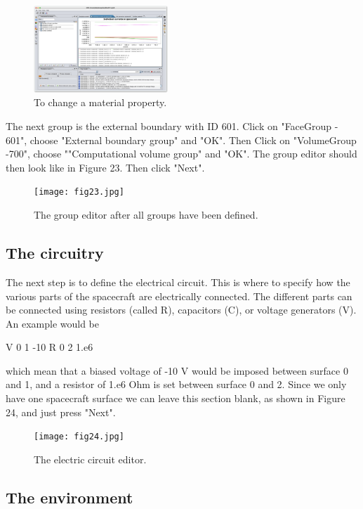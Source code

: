 \documentclass[a4paper, 11pt]{article}
\begin{document}
\begin{figure}[!ht]
    \centering
    \includegraphics[width=0.45\textwidth]{fig22.jpg}
    \caption{To change a material property.}
\end{figure}

The next group is the external boundary with ID 601. Click on "FaceGroup - 601",  choose "External boundary group" and "OK". Then Click on "VolumeGroup -700", choose ""Computational volume group" and "OK". The group editor should then look like in Figure 23. Then click "Next".

\begin{figure}[!ht]
    \centering
    \texttt{[image: fig23.jpg]}
    \caption{The group editor after all groups have been defined.}
\end{figure}

\subsection{The circuitry}

The next step is to define the electrical circuit. This is where to specify how the various parts of the spacecraft are electrically connected. The different parts can be connected using resistors (called R), capacitors (C), or voltage generators (V). An example would be\par

V  0  1  -10
R  0  2  1.e6

which mean that a biased voltage of -10 V would be imposed between surface 0 and 1, and a resistor of 1.e6 Ohm is set between surface 0 and 2. Since we only have one spacecraft surface we can leave this section blank, as shown in Figure 24, and just press "Next".

\begin{figure}[!ht]
    \centering
    \texttt{[image: fig24.jpg]}
    \caption{The electric circuit editor.}
\end{figure}

\subsection{The environment}
\end{document}
